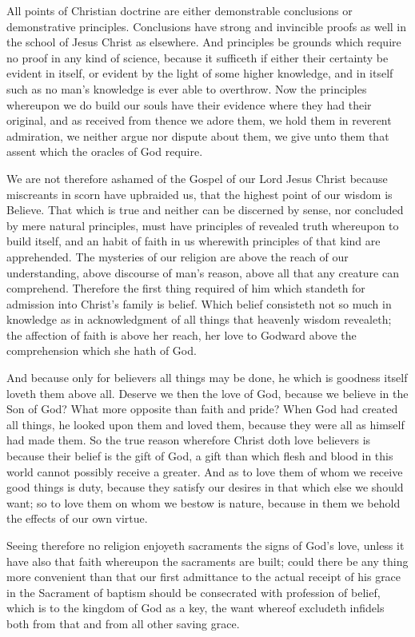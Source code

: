 All points of Christian doctrine are either demonstrable conclusions or demonstrative principles. Conclusions have strong and invincible proofs as well in the school of Jesus Christ as elsewhere. And principles be grounds which require no proof in any kind of science, because it sufficeth if either their certainty be evident in itself, or evident by the light of some higher knowledge, and in itself such as no  man’s knowledge is ever able to overthrow. Now the principles whereupon we do build our souls have their evidence where they had their original, and as received from thence we adore them, we hold them in reverent admiration, we neither argue nor dispute about them, we give unto them that assent which the oracles of God require.

We are not therefore ashamed of the Gospel of our Lord Jesus Christ because miscreants in scorn have upbraided us, that the highest point of our wisdom is Believe. That which is true and neither can be discerned by sense, nor concluded by mere natural principles, must have principles of revealed truth whereupon to build itself, and an habit of faith in us wherewith principles of that kind are apprehended. The mysteries of our religion are above the reach of our understanding, above discourse of man’s reason, above all that any creature can comprehend. Therefore the first thing required of him which standeth for admission into Christ’s family is belief. Which belief consisteth not so much in knowledge as in acknowledgment of all things that heavenly wisdom revealeth; the affection of faith is above her reach, her love to Godward above the comprehension which she hath of God.

And because only for believers all things may be done, he which is goodness itself loveth them above all. Deserve we then the love of God, because we believe in the Son of God? What more opposite than faith and pride? When God had created all things, he looked upon them and loved them, because they were all as himself had made them. So the true reason wherefore Christ doth love believers is because their belief is the gift of God, a gift than which flesh and blood in this world cannot possibly receive a greater. And as to love them of whom we receive good things is duty, because they satisfy our desires in that which else we should want; so to love them on whom we bestow is nature, because in them we behold the effects of our own virtue.

Seeing therefore no religion enjoyeth sacraments the signs of God’s love, unless it have also that faith whereupon the  sacraments are built;
 could there be any thing more convenient than that our first admittance to the actual receipt of his grace in the Sacrament of baptism should be consecrated with profession of belief, which is to the kingdom of God as a key, the want whereof excludeth infidels both from that and from all other saving grace.

